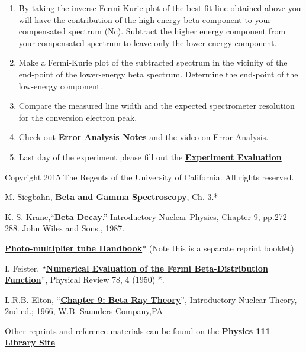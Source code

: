\documentclass{../lab}
\begin{document}
\begin{enumerate}
\begin{enumerate}
        \item By taking the inverse-Fermi-Kurie plot of the best-fit line obtained above you will have the contribution of the high-energy beta-component to your compensated spectrum (Nc). Subtract the higher energy component from your compensated spectrum to leave only the lower-energy component.

        \item Make a Fermi-Kurie plot of the subtracted spectrum in the vicinity of the end-point of the lower-energy beta spectrum. Determine the end-point of the low-energy component.

        \item Compare the measured line width and the expected spectrometer resolution for the conversion electron peak.

        \item Check out \href{\ErrorAnalysisNotes}{\textbf{\textbf{Error Analysis Notes}}} and the video on Error Analysis.

        \item Last day of the experiment please fill out the \href{\ExperimentEvaluation}{\textbf{Experiment Evaluation}}

    \end{enumerate}

\end{enumerate}

Copyright 2015 The Regents of the University of California. All rights reserved.

\begin{thebibliography}{}
\label{sec:References}
     M. Siegbahn, \href{http://physics111.lib.berkeley.edu/Physics111/Reprints/BRA/02-Beta\_Ray\_Spectrometer.pdf}{\textbf{Beta and Gamma Spectroscopy}}, Ch. 3.*

     K. S. Krane,``\href{http://physics111.lib.berkeley.edu/Physics111/Reprints/BRA/03-Beta\_Decay.pdf}{\textbf{Beta Decay}}.'' Introductory Nuclear Physics, Chapter 9, pp.272-288. John Wiles and Sons., 1987.

     \href{http://physics111.lib.berkeley.edu/Physics111/Equipment\_Manuals/RCA\_PMT.pdf}{\textbf{Photo-multiplier tube Handbook}}* (Note this is a separate reprint booklet)

     I. Feister, ``\href{http://physics111.lib.berkeley.edu/Physics111/Reprints/BRA/Feister_EvaluationoftheFermiBeta-DistributionFunction.pdf}{\textbf{Numerical Evaluation of the Fermi Beta-Distribution Function}}'', Physical Review 78, 4 (1950) *\*.

     L.R.B. Elton, ``\href{http://physics111.lib.berkeley.edu/Physics111/Reprints/BRA/Elton\_Nuclear\%20Theory\%20Ch.\%209\%20Beta\%20Decay.pdf}{\textbf{Chapter 9: Beta Ray Theory}}'', Introductory Nuclear Theory, 2nd ed.; 1966, W.B. Saunders Company,PA
\end{thebibliography}

Other reprints and reference materials can be found on the \href{http://physics111.lib.berkeley.edu/Physics111/Reprints/BRA/BRA\_index.html}{\textbf{Physics 111 Library Site}}
\end{document}
